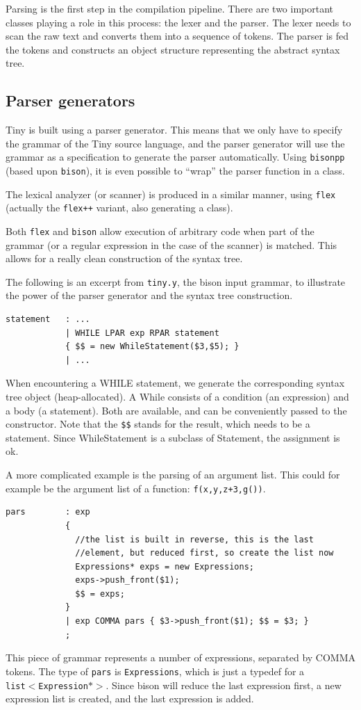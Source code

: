 \documentclass[a4paper]{article}
\begin{document}
Parsing is the first step in the compilation pipeline. There are two important
classes playing a role in this process: the lexer and the parser. The lexer
needs to scan the raw text and converts them into a sequence of tokens. The
parser is fed the tokens and constructs an object structure representing the
abstract syntax tree.

\subsection{Parser generators}

Tiny is built using a parser generator. This means that we only have to
specify the grammar of the Tiny source language, and the parser generator will
use the grammar as a specification to generate the parser automatically. Using
\texttt{bisonpp} (based upon \texttt{bison}), it is even possible to ``wrap''
the parser function in a class.

The lexical analyzer (or scanner) is produced in a similar manner, using
\texttt{flex} (actually the \texttt{flex++} variant, also generating a class).

Both \texttt{flex} and \texttt{bison} allow execution of arbitrary code when
part of the grammar (or a regular expression in the case of the scanner) is
matched. This allows for a really clean construction of the syntax tree.

The following is an excerpt from \texttt{tiny.y}, the bison input grammar, to
illustrate the power of the parser generator and the syntax tree construction.

\begin{verbatim}
statement   : ...
            | WHILE LPAR exp RPAR statement
            { $$ = new WhileStatement($3,$5); } 
            | ...
\end{verbatim}

When encountering a WHILE statement, we generate the corresponding syntax tree
object (heap-allocated). A While consists of a condition (an expression) and
a body (a statement). Both are available, and can be conveniently passed to
the constructor. Note that the \texttt{\$\$} stands for the result, which
needs to be a statement. Since WhileStatement is a subclass of Statement, the
assignment is ok.

A more complicated example is the parsing of an argument list. This could for
example be the argument list of a function: \texttt{f(x,y,z+3,g())}.
\begin{verbatim}
pars        : exp
            {
              //the list is built in reverse, this is the last
              //element, but reduced first, so create the list now
              Expressions* exps = new Expressions;
              exps->push_front($1);
              $$ = exps;
            }
            | exp COMMA pars { $3->push_front($1); $$ = $3; }
            ;
\end{verbatim}
This piece of grammar represents a number of expressions, separated by COMMA
tokens. The type of \texttt{pars} is \texttt{Expressions}, which is just a
typedef for a\\ \texttt{list$<$Expression$*>$}. Since bison will reduce the last
expression first, a new expression list is created, and the last expression is
added.
\end{document}
